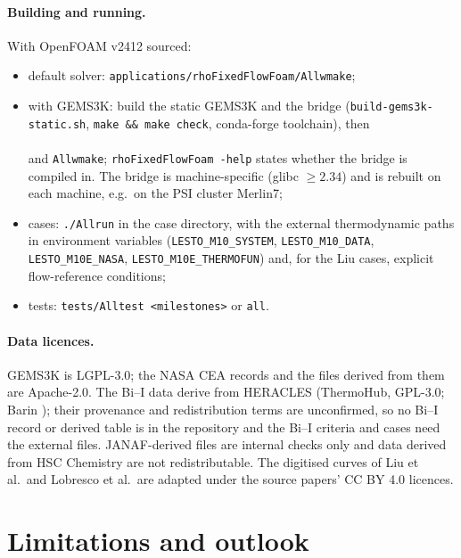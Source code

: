 \documentclass[11pt,a4paper]{article}
\begin{document}
\paragraph{Building and running.} With OpenFOAM v2412 sourced:
\begin{itemize}
\item default solver: \texttt{applications/rhoFixedFlowFoam/Allwmake};
\item with GEMS3K: build the static GEMS3K and the bridge
  (\texttt{build-gems3k-static.sh}, \texttt{make \&\& make check}, conda-forge
  toolchain), then\\ \\
  and \texttt{Allwmake}; \texttt{rhoFixedFlowFoam -help} states whether the
  bridge is compiled in. The bridge is machine-specific (glibc $\ge2.34$)
  and is rebuilt on each machine, e.g.\ on the PSI cluster Merlin7;
\item cases: \texttt{./Allrun} in the case directory, with the external
  thermodynamic paths in environment variables
  (\texttt{LESTO\_M10\_SYSTEM}, \texttt{LESTO\_M10\_DATA},
  \texttt{LESTO\_M10E\_NASA}, \texttt{LESTO\_M10E\_THERMOFUN}) and, for the
  Liu cases, explicit flow-reference conditions;
\item tests: \texttt{tests/Alltest <milestones>} or \texttt{all}.
\end{itemize}

\paragraph{Data licences.} GEMS3K is LGPL-3.0; the NASA CEA records and
the files derived from them are Apache-2.0. The Bi--I data derive from
HERACLES (ThermoHub, GPL-3.0; Barin \cite{Barin1995thermochemical}); their
provenance and redistribution terms are unconfirmed, so no Bi--I record
or derived table is in the repository and the Bi--I criteria and cases
need the external files. JANAF-derived files are internal checks only and
data derived from HSC Chemistry are not redistributable. The digitised
curves of Liu et al.\ and Lobresco et al.\ are adapted under the source
papers' CC BY 4.0 licences.

\section{Limitations and outlook}
\label{sec:outlook}
\end{document}
